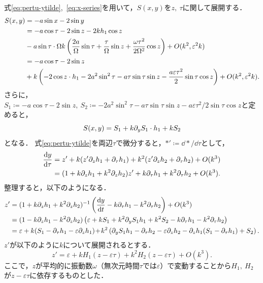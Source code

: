\documentclass[../main]{subfiles}
\begin{document}
    式\eqref{eq:pertu-ytilde},\ \eqref{eq:x-series}を用いて，$S(x,y)$を$z,\ \tau$に関して展開する．
    \begin{align}
        S(x,y)&=-a\sin x-2\sin y\notag\\
        &=-a\cos\tau-2\sin z-2 kh_1\cos z\notag\\
        &-a\sin\tau\cdot \Omega k\left(\frac{2a}{\Omega}\sin\tau+\frac{\tau}{\Omega}\sin z+\frac{\omega \tau^2}{2\Omega^2}\cos z\right)+O(k^2,\varepsilon^2k)\notag\\
        &=-a\cos\tau-2\sin z\notag\\
        &+k\left(-2 \cos z\cdot h_1-2a^2\sin^2\tau-a\tau\sin \tau\sin z-\frac{a\varepsilon \tau^2}{2}\sin \tau \cos z\right)+O(k^2,\varepsilon^2k).
    \end{align}
    さらに，$S_1\coloneqq-a\cos\tau-2\sin z,\ S_2\coloneqq -2a^2\sin^2\tau-a\tau\sin \tau\sin z-a\varepsilon \tau^2/2\sin \tau \cos z$と定めると，
    \begin{equation}
        S(x,y)=S_1+k\partial_y S_1\cdot h_1+kS_2
    \end{equation}
    となる．
    式\eqref{eq:pertu-ytilde}を両辺$\tau$で微分すると，$\ast'\coloneqq\dd{\ast}/\dd{\tau}$として，
    \begin{align}
        \dv{y}{\tau}&=z'+k(z'\partial_zh_1+\partial_\tau h_1)+k^2(z'\partial_zh_2+\partial_\tau h_2)+O(k^3)\notag\\
        &=(1+k\partial_zh_1+k^2\partial_zh_2)z'+k\partial_\tau h_1+k^2\partial_\tau h_2+O(k^3).
    \end{align}
    整理すると，以下のようになる．
    \begin{align}
        z'&=(1+k\partial_zh_1+k^2\partial_zh_2)^{-1}\left( \dv{y}{t}-k\partial_\tau h_1-k^2\partial_\tau h_2 \right)+O(k^3)\notag\\
        &=(1-k\partial_zh_1-k^2\partial_zh_2)\left(\varepsilon+kS_1+k^2 \partial_y S_1h_1+k^2S_2-k\partial_\tau h_1-k^2\partial_\tau h_2 \right)\notag\\
        &=\varepsilon+k(S_1-\partial_\tau h_1-\varepsilon\partial_zh_1)\!+\!k^2\left(\partial_y S_1h_1 -\partial_\tau h_2-\varepsilon\partial_zh_2 -\partial_zh_1(S_1-\partial_\tau h_1)+S_2\right).
    \end{align}
    $z'$が以下のように$k$について展開されるとする．
    \begin{equation}
        z'=\varepsilon+kH_1(z-\varepsilon \tau)+k^2H_2(z-\varepsilon \tau)+O(k^3).
    \end{equation}
    ここで，$z$が平均的に振動数$\omega$（無次元時間$\tau$では$\varepsilon$）で変動することから$H_1,\ H_2$が$z-\varepsilon \tau$に依存するものとした．
    
\end{document}
